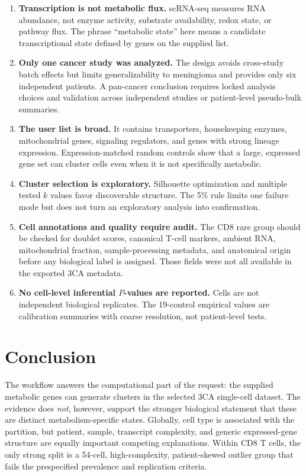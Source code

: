 \documentclass[11pt]{article}
\begin{document}
\begin{enumerate}
\item \textbf{Transcription is not metabolic flux.} scRNA-seq measures RNA abundance, not enzyme activity, substrate availability, redox state, or pathway flux. The phrase ``metabolic state'' here means a candidate transcriptional state defined by genes on the supplied list.
\item \textbf{Only one cancer study was analyzed.} The design avoids cross-study batch effects but limits generalizability to meningioma and provides only six independent patients. A pan-cancer conclusion requires locked analysis choices and validation across independent studies or patient-level pseudo-bulk summaries.
\item \textbf{The user list is broad.} It contains transporters, housekeeping enzymes, mitochondrial genes, signaling regulators, and genes with strong lineage expression. Expression-matched random controls show that a large, expressed gene set can cluster cells even when it is not specifically metabolic.
\item \textbf{Cluster selection is exploratory.} Silhouette optimization and multiple tested $k$ values favor discoverable structure. The 5\% rule limits one failure mode but does not turn an exploratory analysis into confirmation.
\item \textbf{Cell annotations and quality require audit.} The CD8 rare group should be checked for doublet scores, canonical T-cell markers, ambient RNA, mitochondrial fraction, sample-processing metadata, and anatomical origin before any biological label is assigned. Those fields were not all available in the exported 3CA metadata.
\item \textbf{No cell-level inferential $P$-values are reported.} Cells are not independent biological replicates. The 19-control empirical values are calibration summaries with coarse resolution, not patient-level tests.
\end{enumerate}

\section{Conclusion}

The workflow answers the computational part of the request: the supplied metabolic genes can generate clusters in the selected 3CA single-cell dataset. The evidence does \emph{not}, however, support the stronger biological statement that these are distinct metabolism-specific states. Globally, cell type is associated with the partition, but patient, sample, transcript complexity, and generic expressed-gene structure are equally important competing explanations. Within CD8 T cells, the only strong split is a 54-cell, high-complexity, patient-skewed outlier group that fails the prespecified prevalence and replication criteria.
\end{document}
